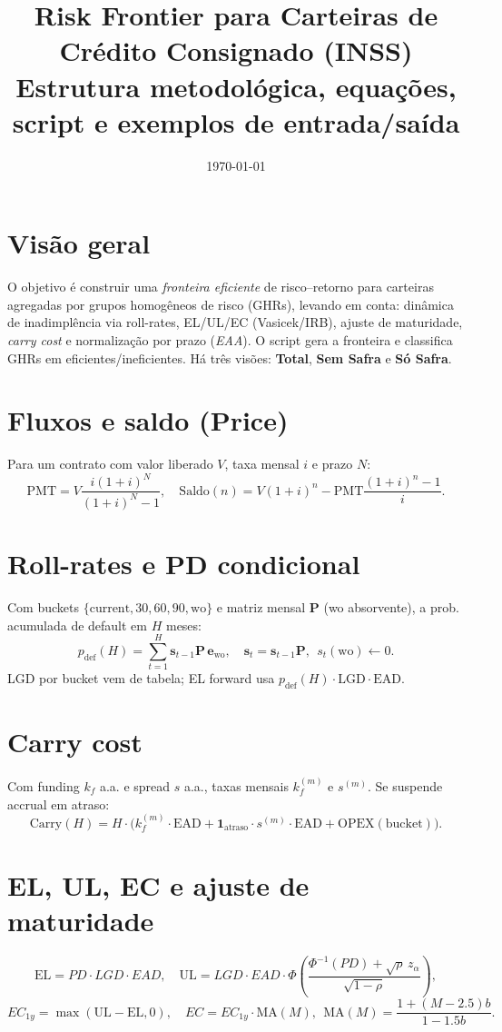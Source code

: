 \documentclass[11pt,a4paper]{article}
\title{Risk Frontier para Carteiras de Crédito Consignado (INSS)\\
\large Estrutura metodológica, equações, script e exemplos de entrada/saída}
\author{}
\date{\today}
\newcommand{\1}{\mathbf{1}}
\newcommand{\vect}[1]{\bm{#1}}
\begin{document}
\maketitle

\section{Visão geral}
O objetivo é construir uma \emph{fronteira eficiente} de risco--retorno para carteiras agregadas por grupos homogêneos de risco (GHRs), levando em conta: dinâmica de inadimplência via roll-rates, EL/UL/EC (Vasicek/IRB), ajuste de maturidade, \emph{carry cost} e normalização por prazo (\emph{EAA}). O script gera a fronteira e classifica GHRs em eficientes/ineficientes. Há três visões: \textbf{Total}, \textbf{Sem Safra} e \textbf{Só Safra}.

\section{Fluxos e saldo (Price)}
Para um contrato com valor liberado $V$, taxa mensal $i$ e prazo $N$:
\[
\mathrm{PMT}=V\frac{i(1+i)^N}{(1+i)^N-1},\quad
\mathrm{Saldo}(n)=V(1+i)^n-\mathrm{PMT}\frac{(1+i)^n-1}{i}.
\]

\section{Roll-rates e PD condicional}
Com buckets $\{\text{current},30,60,90,\text{wo}\}$ e matriz mensal $\mathbf{P}$ (wo absorvente), a prob. acumulada de default em $H$ meses:
\[
p_{\text{def}}(H)=\sum_{t=1}^{H}\vect{s}_{t-1}\mathbf{P}\,\vect{e}_{\text{wo}},\quad
\vect{s}_t=\vect{s}_{t-1}\mathbf{P},\ \ s_t(\text{wo})\gets 0.
\]
LGD por bucket vem de tabela; EL forward usa $p_{\text{def}}(H)\cdot \text{LGD}\cdot \text{EAD}$.

\section{Carry cost}
Com funding $k_f$ a.a. e spread $s$ a.a., taxas mensais $k_f^{(m)}$ e $s^{(m)}$. Se suspende accrual em atraso:
\[
\mathrm{Carry}(H)=H\cdot\big(k_f^{(m)}\cdot \text{EAD} + \1_{\text{atraso}}\cdot s^{(m)}\cdot \text{EAD} + \mathrm{OPEX}(\text{bucket})\big).
\]

\section{EL, UL, EC e ajuste de maturidade}
\[
\mathrm{EL}=PD\cdot LGD\cdot EAD,\quad
\mathrm{UL}=LGD\cdot EAD\cdot \Phi\!\left(\frac{\Phi^{-1}(PD)+\sqrt{\rho}\,z_\alpha}{\sqrt{1-\rho}}\right),
\]
\[
EC_{1y}=\max(\mathrm{UL}-\mathrm{EL},0),\quad
EC=EC_{1y}\cdot \mathrm{MA}(M),\ \ \mathrm{MA}(M)=\frac{1+(M-2.5)b}{1-1.5b}.
\]
\end{document}
